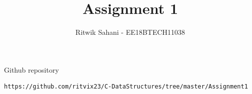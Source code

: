 \documentclass[journal,12pt,twocolumn]{IEEEtran}
\DeclareMathOperator*{\Res}{Res}
\begin{document}
\newtheorem{theorem}{Theorem}[section]
\newtheorem{problem}{Problem}
\newtheorem{proposition}{Proposition}[section]
\newtheorem{lemma}{Lemma}[section]
\newtheorem{corollary}[theorem]{Corollary}
\newtheorem{example}{Example}[section]
\newtheorem{definition}[problem]{Definition}

\newcommand{\BEQA}{\begin{eqnarray}}
\newcommand{\EEQA}{\end{eqnarray}}
\newcommand{\define}{\stackrel{\triangle}{=}}

\raggedbottom
\setlength{\parindent}{0pt}
\providecommand{\mbf}{\mathbf}
\providecommand{\pr}[1]{\ensuremath{\Pr\left(#1\right)}}
\providecommand{\qfunc}[1]{\ensuremath{Q\left(#1\right)}}
\providecommand{\sbrak}[1]{\ensuremath{{}\left[#1\right]}}
\providecommand{\lsbrak}[1]{\ensuremath{{}\left[#1\right.}}
\providecommand{\rsbrak}[1]{\ensuremath{{}\left.#1\right]}}
\providecommand{\brak}[1]{\ensuremath{\left(#1\right)}}
\providecommand{\lbrak}[1]{\ensuremath{\left(#1\right.}}
\providecommand{\rbrak}[1]{\ensuremath{\left.#1\right)}}
\providecommand{\cbrak}[1]{\ensuremath{\left\{#1\right\}}}
\providecommand{\lcbrak}[1]{\ensuremath{\left\{#1\right.}}
\providecommand{\rcbrak}[1]{\ensuremath{\left.#1\right\}}}
\theoremstyle{remark}
\newtheorem{rem}{Remark}
\newcommand{\sgn}{\mathop{\mathrm{sgn}}}
\providecommand{\fourier}{\overset{\mathcal{F}}{ \rightleftharpoons}}
\providecommand{\system}{\overset{\mathcal{H}}{ \longleftrightarrow}}
\newcommand{\solution}{\noindent \textbf{Solution: }}
\newcommand{\cosec}{\,\text{cosec}\,}
\providecommand{\dec}[2]{\ensuremath{\overset{#1}{\underset{#2}{\gtrless}}}}
\newcommand{\myvec}[1]{\ensuremath{\begin{pmatrix}#1\end{pmatrix}}}
\newcommand{\mydet}[1]{\ensuremath{\begin{vmatrix}#1\end{vmatrix}}}
\def\putbox#1#2#3{\makebox[0in][l]{\makebox[#1][l]{}\raisebox{\baselineskip}[0in][0in]{\raisebox{#2}[0in][0in]{#3}}}}
     \def\rightbox#1{\makebox[0in][r]{#1}}
     \def\centbox#1{\makebox[0in]{#1}}
     \def\topbox#1{\raisebox{-\baselineskip}[0in][0in]{#1}}
     \def\midbox#1{\raisebox{-0.5\baselineskip}[0in][0in]{#1}}
\vspace{3cm}
\title{Assignment 1}
\author{Ritwik Sahani - EE18BTECH11038}
\maketitle
\bigskip
Github repository
%
\begin{lstlisting}
https://github.com/ritvix23/C-DataStructures/tree/master/Assignment1
\end{lstlisting}
\setcounter{figure}{0}
\end{document}
